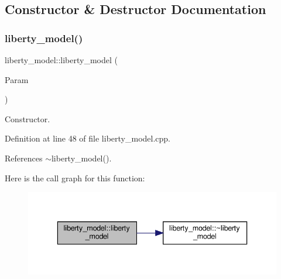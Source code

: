 \subsection{Constructor \& Destructor Documentation}
\mbox{\label{classliberty__model_a581807fbf6a780b5cf8a4e7cb3afb1c4}} 
\subsubsection{\texorpdfstring{liberty\+\_\+model()}{liberty\_model()}}
{\footnotesize\ttfamily liberty\+\_\+model\+::liberty\+\_\+model (\begin{DoxyParamCaption}\item[{const \hyperlink{Parameter_8hpp_a37841774a6fcb479b597fdf8955eb4ea}{Parameter\+Const\+Ref}}]{Param }\end{DoxyParamCaption})\hspace{0.3cm}{\ttfamily [explicit]}}



Constructor. 



Definition at line 48 of file liberty\+\_\+model.\+cpp.



References $\sim$liberty\+\_\+model().

Here is the call graph for this function\+:
\nopagebreak
\begin{figure}[H]
\begin{center}
\leavevmode
\includegraphics[width=336pt]{d0/dae/classliberty__model_a581807fbf6a780b5cf8a4e7cb3afb1c4_cgraph}
\end{center}
\end{figure}
\mbox{\label{classliberty__model_adbd9cd5623f351c59d62e07e36a9254f}} 
